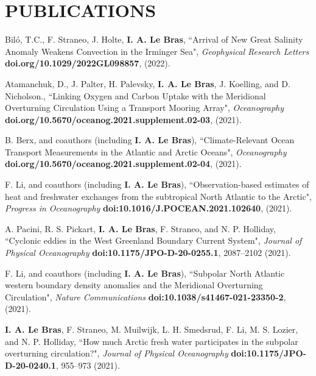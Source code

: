 \documentclass[paper=letter,fontsize=11pt]{scrartcl} %
\newcommand{\NewPart}[2]{\section*{\uppercase{#1} #2}}
\newcommand{\PaperEntry}[6]{
		\noindent #1, ``#2", \textit{#3} \textbf{#4}, #5 (#6).}
\begin{document}

\NewPart{Publications}{}


\begin{etaremune}


\item \PaperEntry{Bil\'{o}, T.C., F. Straneo, J. Holte, \textbf{I. A. Le Bras}}{Arrival of New Great Salinity Anomaly Weakens Convection in the Irminger Sea}{Geophysical Research Letters}{doi.org/10.1029/2022GL098857}{}{2022}

\item \PaperEntry{Atamanchuk, D., J. Palter, H. Palevsky, \textbf{I. A. Le Bras}, J. Koelling, and D. Nicholson.}{Linking Oxygen and Carbon Uptake with the Meridional Overturning Circulation Using a Transport Mooring Array}{Oceanography}{doi.org/10.5670/oceanog.2021.supplement.02-03}{}{2021}

\item \PaperEntry{B. Berx, and coauthors (including \textbf{I. A. Le Bras})}{Climate-Relevant Ocean Transport Measurements in the Atlantic and Arctic Oceans}{Oceanography}{doi.org/10.5670/oceanog.2021.supplement.02-04}{}{2021}

\item \PaperEntry{F. Li, and coauthors (including \textbf{I. A. Le Bras})}{Observation-based estimates of heat and freshwater exchanges from the subtropical North Atlantic to the Arctic}{Progress in Oceanography}{doi:10.1016/J.POCEAN.2021.102640}{}{2021}

\item \PaperEntry{A. Pacini, R. S. Pickart, \textbf{I. A. Le Bras}, F. Straneo, and N. P. Holliday}{Cyclonic eddies in the West Greenland Boundary Current System}{Journal of Physical Oceanography}{doi:10.1175/JPO-D-20-0255.1}{2087--2102}{2021}


\item \PaperEntry{F. Li, and coauthors (including \textbf{I. A. Le Bras})}{Subpolar North Atlantic western boundary density anomalies and the Meridional Overturning Circulation}{Nature Communications}{doi:10.1038/s41467-021-23350-2}{}{2021}

\item \PaperEntry{\textbf{I. A. Le Bras}, F. Straneo, M. Muilwijk, L. H. Smedsrud, F. Li, M. S. Lozier, and N. P. Holliday}{How much Arctic fresh water participates in the subpolar overturning circulation?}{Journal of Physical Oceanography}{doi:10.1175/JPO-D-20-0240.1}{955--973}{2021}


\end{etaremune}
\end{document}

